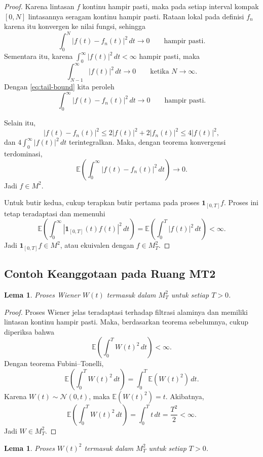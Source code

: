 \documentclass[12pt,a4paper]{article}
\theoremstyle{definition}
\theoremstyle{plain}
\newtheorem{lema}[definisi]{Lema}
\newcommand{\E}{\mathbb{E}}
\newcommand{\ind}{\mathbf{1}}
\begin{document}
\begin{proof}
  Karena lintasan $f$ kontinu hampir pasti, maka pada setiap interval kompak
  $[0,N]$ lintasannya seragam kontinu hampir pasti. Rataan lokal pada definisi
  $f_n$ karena itu konvergen ke nilai fungsi, sehingga
  \[
    \int_0^N |f(t)-f_n(t)|^2\,dt\to 0
    \qquad \text{hampir pasti.}
  \]
  Sementara itu, karena $\int_0^\infty |f(t)|^2\,dt<\infty$ hampir pasti, maka
  \[
    \int_{N-1}^\infty |f(t)|^2\,dt\to 0
    \qquad \text{ketika }N\to\infty.
  \]
  Dengan \eqref{eq:tail-bound} kita peroleh
  \[
    \int_0^\infty |f(t)-f_n(t)|^2\,dt\to 0
    \qquad \text{hampir pasti.}
  \]

  Selain itu,
  \[
    |f(t)-f_n(t)|^2\le 2|f(t)|^2+2|f_n(t)|^2\le 4|f(t)|^2,
  \]
  dan $4\int_0^\infty |f(t)|^2\,dt$ terintegralkan. Maka, dengan teorema
  konvergensi terdominasi,
  \[
    \E\left(\int_0^\infty |f(t)-f_n(t)|^2\,dt\right)\to 0.
  \]
  Jadi $f\in M^2$.

  Untuk butir kedua, cukup terapkan butir pertama pada proses
  $\ind_{[0,T]}f$. Proses ini tetap teradaptasi dan memenuhi
  \[
    \E\left(\int_0^\infty |\ind_{[0,T]}(t)f(t)|^2\,dt\right)
    =
    \E\left(\int_0^T |f(t)|^2\,dt\right)<\infty.
  \]
  Jadi $\ind_{[0,T]}f\in M^2$, atau ekuivalen dengan $f\in M_T^2$.
\end{proof}

\subsection{Contoh Keanggotaan pada Ruang MT2}

\begin{lema}
  Proses Wiener $W(t)$ termasuk dalam $M_T^2$ untuk setiap $T>0$.
\end{lema}

\begin{proof}
  Proses Wiener jelas teradaptasi terhadap filtrasi alaminya dan memiliki
  lintasan kontinu hampir pasti. Maka, berdasarkan teorema sebelumnya, cukup
  diperiksa bahwa
  \[
    \E\left(\int_0^T W(t)^2\,dt\right)<\infty.
  \]
  Dengan teorema Fubini--Tonelli,
  \[
    \E\left(\int_0^T W(t)^2\,dt\right)
    =
    \int_0^T \E(W(t)^2)\,dt.
  \]
  Karena $W(t)\sim\mathcal{N}(0,t)$, maka $\E(W(t)^2)=t$. Akibatnya,
  \[
    \E\left(\int_0^T W(t)^2\,dt\right)
    =
    \int_0^T t\,dt
    =
    \frac{T^2}{2}
    <\infty.
  \]
  Jadi $W\in M_T^2$.
\end{proof}

\begin{lema}
  Proses $W(t)^2$ termasuk dalam $M_T^2$ untuk setiap $T>0$.
\end{lema}
\end{document}
